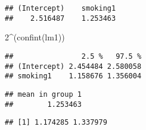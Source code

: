 \documentclass[
]{article}
\newenvironment{Shaded}{\begin{snugshade}}{\end{snugshade}}
\newcommand{\DecValTok}[1]{\textcolor[rgb]{0.00,0.00,0.81}{#1}}
\newcommand{\DocumentationTok}[1]{\textcolor[rgb]{0.56,0.35,0.01}{\textbf{\textit{#1}}}}
\newcommand{\FunctionTok}[1]{\textcolor[rgb]{0.00,0.00,0.00}{#1}}
\newcommand{\NormalTok}[1]{#1}
\newcommand{\OtherTok}[1]{\textcolor[rgb]{0.56,0.35,0.01}{#1}}
\newcommand{\SpecialCharTok}[1]{\textcolor[rgb]{0.00,0.00,0.00}{#1}}
\begin{document}
\begin{Shaded}
\end{Shaded}

\begin{verbatim}
## (Intercept)    smoking1 
##    2.516487    1.253463
\end{verbatim}

\begin{Shaded}
\begin{Highlighting}[]
\DecValTok{2}\SpecialCharTok{\^{}}\NormalTok{(}\FunctionTok{confint}\NormalTok{(lm1))}
\end{Highlighting}
\end{Shaded}

\begin{verbatim}
##                2.5 %   97.5 %
## (Intercept) 2.454484 2.580058
## smoking1    1.158676 1.356004
\end{verbatim}

\begin{Shaded}
\end{Shaded}

\begin{verbatim}
## mean in group 1 
##        1.253463
\end{verbatim}

\begin{Shaded}
\end{Shaded}

\begin{verbatim}
## [1] 1.174285 1.337979
\end{verbatim}
\end{document}
